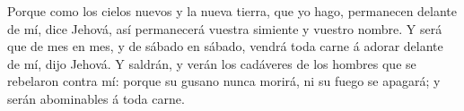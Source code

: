  Porque como los cielos nuevos y la nueva tierra, que yo
hago, permanecen delante de mí, dice Jehová, así permanecerá vuestra
simiente y vuestro nombre.  Y será que de mes en mes, y
de sábado en sábado, vendrá toda carne á adorar delante de mí, dijo
Jehová.  Y saldrán, y verán los cadáveres de los hombres
que se rebelaron contra mí: porque su gusano nunca morirá, ni su fuego
se apagará; y serán abominables á toda carne.
